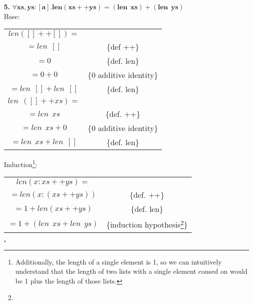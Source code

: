 \documentclass[12pt]{article}
\begin{document}
\clearpage

\textbf{5.} $\pmb{\forall xs, ys:[a]. len(xs ++ ys) = (len~~xs) + (len~~ys)}$ \\
Base:
\begin{center}
\begin{tabular}{cc}
$len([] ++ []) = $ & {} \\
$= len~~[]$ & \{def ++\} \\
$= 0$ & \{def. len\} \\
$= 0 + 0$ & \{0 additive identity\} \\
$= len~~[] + len~~[]$ & \{def. len\} \\
\hline
$len~~([] ++ xs) = $ & {} \\
$= len~~xs$ & \{def. ++\} \\
$= len~~xs + 0$ & \{0 additive identity\} \\
$= len~~xs + len~~[]$ & \{def. len\}
\end{tabular}
\end{center}

Induction\footnote{Additionally, the length of a single element is 1, so we can intuitively understand that the length of two lists with a single element consed on would be 1 plus the length of those lists.}:
\begin{center}
\begin{tabular}{cc}
$len(x:xs ++ ys) = $ & {} \\
$= len(x:(xs ++ ys))$ & \{def. ++\} \\
$= 1 + len(xs ++ ys)$ & \{def. len\} \\
$= 1 + (len~~xs + len~~ys)$ & \{induction hypothesis\footnote[3]{}\} \\
\end{tabular}
\end{center}
$\square$
\end{document}
